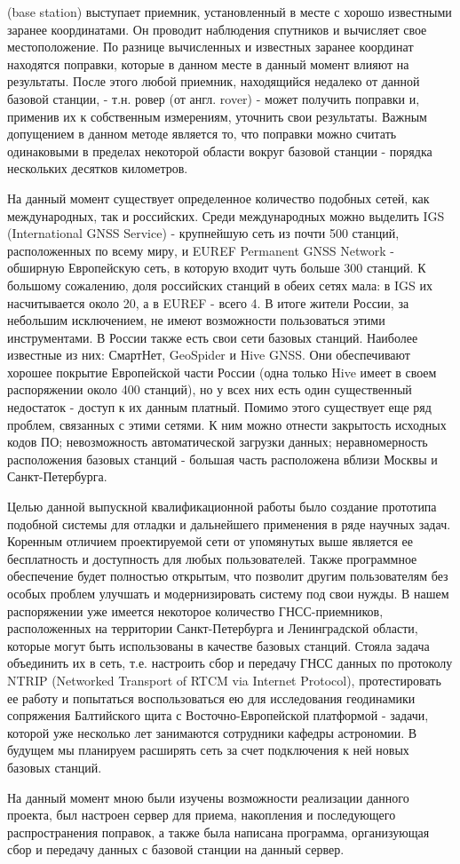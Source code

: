 \documentclass[a4paper,12pt]{report}
\begin{document}
(base station) выступает приемник, установленный в месте с хорошо известными заранее координатами. Он проводит наблюдения спутников и 
вычисляет свое местоположение. По разнице вычисленных и известных заранее координат находятся поправки, которые в данном месте в данный 
момент влияют на результаты. После этого любой приемник, находящийся недалеко от данной базовой станции, - т.н. ровер (от англ. rover) - 
может получить поправки и, применив их к собственным измерениям, уточнить свои результаты. Важным допущением в данном методе является то, 
что поправки можно считать одинаковыми в пределах некоторой области вокруг базовой станции - порядка нескольких десятков километров. \par
На данный момент существует определенное количество подобных сетей, как международных, так и российских. Среди международных можно 
выделить IGS (International GNSS Service) - крупнейшую сеть из почти 500 станций, расположенных по всему миру, и EUREF Permanent GNSS 
Network - обширную Европейскую сеть, в которую входит чуть больше 300 станций. К большому сожалению, доля российских станций в обеих 
сетях мала: в IGS их насчитывается около 20, а в EUREF - всего 4. В итоге жители России, за небольшим исключением, не имеют возможности 
пользоваться этими инструментами. В России также есть свои сети базовых станций. Наиболее известные из них: СмартНет, GeoSpider и Hive GNSS.
Они обеспечивают хорошее покрытие Европейской части России (одна только Hive имеет в своем распоряжении около 400 станций), но у всех 
них есть один существенный недостаток - доступ к их данным платный. Помимо этого существует еще ряд проблем, связанных с этими сетями. 
К ним можно отнести закрытость исходных кодов ПО; невозможность автоматической загрузки данных; неравномерность расположения базовых 
станций - большая часть расположена вблизи Москвы и Санкт-Петербурга. \par
Целью данной выпускной квалификационной работы было создание прототипа подобной системы для отладки и дальнейшего применения в ряде
научных задач. Коренным отличием проектируемой сети от упомянутых выше является ее бесплатность и доступность для любых пользователей. 
Также программное обеспечение будет полностью открытым, что позволит другим пользователям без особых проблем улучшать и модернизировать 
систему под свои нужды.
В нашем распоряжении уже имеется некоторое количество ГНСС-приемников, расположенных на территории Санкт-Петербурга и Ленинградской
области, которые могут быть использованы в качестве базовых станций. Стояла задача объединить их в сеть, т.е. настроить сбор и передачу 
ГНСС данных по протоколу NTRIP (Networked Transport of RTCM via Internet Protocol), протестировать ее работу и попытаться воспользоваться 
ею для исследования геодинамики сопряжения Балтийского щита с Восточно-Европейской платформой - задачи, которой уже несколько лет 
занимаются сотрудники кафедры астрономии. В будущем мы планируем расширять сеть за счет подключения к ней новых базовых станций. \par
На данный момент мною были изучены возможности реализации данного проекта, был настроен сервер 
для приема, накопления и последующего распространения поправок, а также была написана программа, организующая сбор и передачу данных с 
базовой станции на данный сервер.
\newpage
\end{document}
